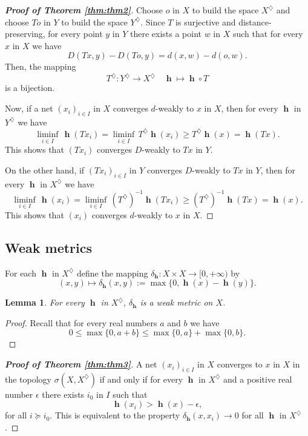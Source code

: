 \documentclass[11pt]{amsart}
\newtheorem{lemma}[theorem]{Lemma}
\theoremstyle{definition}
\numberwithin{equation}{section}
\DeclareMathOperator{\h}{\mathbf{h}} %
\numberwithin{equation}{section}
\begin{document}
\begin{proof}[\bf Proof of Theorem \ref{thm:thm2}]
Choose $o$ in $X$ to build the space $X^\diamondsuit$
and choose $To$ in $Y$ to build the space $Y^\diamondsuit$. 
Since $T$ is surjective and distance-preserving, for every
point $y$ in $Y$ there exists a point $w$ in $X$ such that
for every $x$ in $X$ we have
\[
    D(Tx,y)-D(To,y) = d(x,w)-d(o,w).
\]
Then, the mapping 
\[ T^\diamondsuit : Y^\diamondsuit \to X^\diamondsuit 
\quad \h \mapsto \h\circ T\]
is a bijection. 

Now, if a net $(x_i)_{i\in I}$ in $X$ converges $d$-weakly
to $x$ in $X$, then for every $\h$ in $Y^\diamondsuit$ we 
have
\[
    \liminf_{i\in I}\,\h(Tx_i) 
    = \liminf_{i\in I}\,T^\diamondsuit\h(x_i)
    \geq T^\diamondsuit\h(x)
    = \h(Tx).
\]
This shows that $(Tx_i)$ converges $D$-weakly to $Tx$ in $Y$.

On the other hand, if $(Tx_i)_{i\in I}$ in $Y$ converges 
$D$-weakly to $Tx$ in $Y$, then for every $\h$ in $X^\diamondsuit$
we have
\[
    \liminf_{i\in I}\,\h(x_i) 
    = \liminf_{i\in I}\,(T^\diamondsuit)^{-1}\h(Tx_i)
    \geq (T^\diamondsuit)^{-1}\h(Tx)
    = \h(x).
\]
This shows that $(x_i)$ converges $d$-weakly to $x$ in $X$.
\end{proof}

\subsection{Weak metrics}
For each $\h$ in $X^\diamondsuit$ define the mapping 
$\delta_{\h} : X\times X \to [0,+\infty)$ by
$$
    (x,y) \mapsto \delta_{\h}(x,y):= \max\{0, \h(x) - \h(y)\}.
$$

\begin{lemma}
For every $\h$ in $X^\diamondsuit$, $\delta_{\h}$ is a weak 
metric on $X$.    
\end{lemma}

\begin{proof}
Recall that for every real numbers
$a$ and $b$ we have
\[
 0 \leq \max\{0,a+b\} \leq \max\{0,a\} + \max\{0,b\}.
\]
\end{proof}

\begin{proof}[\bf Proof of Theorem \ref{thm:thm3}]
A net $(x_i)_{i\in I}$ in $X$ converges to
$x$ in $X$ in the topology $\sigma(X,X^\diamondsuit)$
if and only if for every $\h$ in $X^\diamondsuit$ and
a positive real number $\epsilon$ there exists $i_0$ 
in $I$ such that
\[
    \h(x_i) > \h(x) - \epsilon,
\]
for all $i\succcurlyeq i_0$. This is equivalent to
the property $\delta_{\h}(x,x_i)\to 0$ for all 
$\h$ in $X^\diamondsuit$.
\end{proof}
\end{document}
